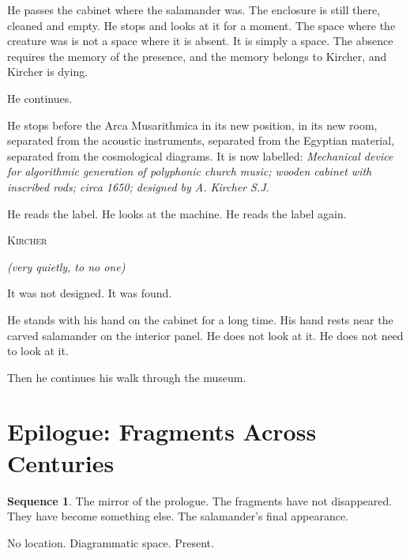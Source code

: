 \documentclass[12pt, a4paper, twoside]{memoir}
\theoremstyle{definition}
\newtheorem{sequence}{Sequence}[chapter]
\theoremstyle{remark}
\newenvironment{sceneheading}{%
  \vspace{8pt}%
  \noindent\begin{mdframed}[
    linecolor=arkgold,
    linewidth=0.8pt,
    leftmargin=0pt,
    rightmargin=0pt,
    innerleftmargin=6pt,
    innerrightmargin=6pt,
    innertopmargin=4pt,
    innerbottommargin=4pt,
    backgroundcolor=arkgold!6
  ]%
  \noindent\textsc\bgroup\small
}{%
  \egroup\end{mdframed}\vspace{4pt}%
}
\newenvironment{action}{%
  \vspace{4pt}%
  \noindent\begin{minipage}{\linewidth}%
  \setlength{\parindent}{0pt}%
  \itshape\color{kircherink}%
}{%
  \end{minipage}\vspace{6pt}%
}
\newenvironment{dialogue}[1]{%
  \vspace{6pt}%
  \noindent\hspace{24mm}%
  \begin{minipage}{0.6\linewidth}%
  \begin{center}%
  {\small\textsc{#1}}%
  \end{center}%
  \vspace{2pt}%
}{%
  \end{minipage}\vspace{6pt}%
}
\newcommand{\paren}[1]{%
  \begin{center}%
  \small\itshape\color{plaguegrey}(#1)%
  \end{center}%
}
\begin{document}
\begin{action}
He passes the cabinet where the salamander was. The enclosure is still there, cleaned and empty. He stops and looks at it for a moment. The space where the creature was is not a space where it is absent. It is simply a space. The absence requires the memory of the presence, and the memory belongs to Kircher, and Kircher is dying.

He continues.

He stops before the Arca Musarithmica in its new position, in its new room, separated from the acoustic instruments, separated from the Egyptian material, separated from the cosmological diagrams. It is now labelled: \textit{Mechanical device for algorithmic generation of polyphonic church music; wooden cabinet with inscribed rods; circa 1650; designed by A. Kircher S.J.}

He reads the label. He looks at the machine. He reads the label again.
\end{action}

\begin{dialogue}{Kircher}
\paren{very quietly, to no one}
It was not designed. It was found.
\end{dialogue}

\begin{action}
He stands with his hand on the cabinet for a long time. His hand rests near the carved salamander on the interior panel. He does not look at it. He does not need to look at it.

Then he continues his walk through the museum.
\end{action}

\clearpage

\section{Epilogue: Fragments Across Centuries}

\begin{sequence}
\label{seq:epilogue}
The mirror of the prologue. The fragments have not disappeared. They have become something else. The salamander's final appearance.
\end{sequence}

\begin{sceneheading}
No location. Diagrammatic space. Present.
\end{sceneheading}
\end{document}
